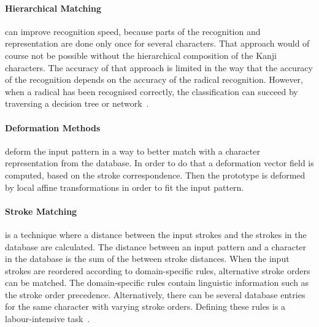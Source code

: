 \paragraph{Hierarchical Matching} can improve recognition speed, because parts 
of the recognition and representation are done only once for several characters.
That approach would of course not be possible without the hierarchical 
composition of the Kanji characters. The accuracy of that approach is limited in
the way that the accuracy of the recognition depends on the accuracy of the
radical recognition. However, when a radical has been recognised correctly, 
the classification can succeed by traversing a decision tree or 
network~.

\paragraph{Deformation Methods} deform the input pattern in a way to better match
with a character representation from the database. In order to do that a 
deformation vector field is computed, based on the stroke correspondence.
Then the prototype is deformed by local affine transformations in order to fit 
the input pattern.

\paragraph{Stroke Matching} is a technique where a distance between the input 
strokes and the strokes in the database are calculated. The distance between an
input pattern and a character in the database is the sum of the between stroke
distances. When the input strokes are reordered according to domain-specific 
rules, alternative stroke orders can be matched. The domain-specific rules 
contain linguistic information such as the stroke order precedence.
Alternatively, there can be several database entries for the same character with
varying stroke orders. Defining these rules is a labour-intensive 
task~.

